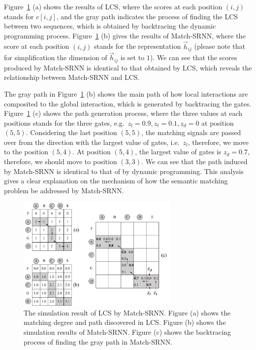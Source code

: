 Figure~\ref{fig:simulation} (a) shows the results of LCS, where the scores at each position $(i,j)$ stands for $c[i,j]$, and the gray path indicates the process of finding the LCS between two sequences, which is obtained by backtracing the dynamic programming process. Figure~\ref{fig:simulation} (b) gives the results of Match-SRNN, where the score at each position $(i,j)$ stands for the representation $\vec{h}_{ij}$ (please note that for simplification the dimension of $\vec{h}_{ij}$ is set to $1$). We can see that the scores produced by Match-SRNN is identical to that obtained by LCS, which reveals the relationship between Match-SRNN and LCS.

The gray path in Figure~\ref{fig:simulation} (b) shows the main path of how local interactions are composited to the global interaction, which
is generated by backtracing the gates. Figure~\ref{fig:simulation} (c) shows the path generation process, where the three values at each positions stands for the three gates, e.g.~$z_l{=}0.9,z_t{=}0.1,z_d{=}0$ at position $(5,5)$. Considering the last position $(5,5)$, the matching signals are passed over from the direction with the largest value of gates, i.e.~$z_l$, therefore, we move to the position $(5,4)$. At position $(5,4)$, the largest value of gates is $z_d{=}0.7$, therefore, we should move to position $(3,3)$. We can see that the path induced by Match-SRNN is identical to that of by dynamic programming. This analysis gives a clear explanation on the mechanism of how the semantic matching problem be addressed by Match-SRNN.

\begin{figure}[t]
\centering
\includegraphics[width=0.7\textwidth]{figures/lcs_simulation_more.pdf}
\caption{The simulation result of LCS by Match-SRNN. Figure (a) shows the matching degree and path discovered in LCS. Figure (b) shows the simulation results of Match-SRNN. Figure (c) shows the backtracing process of finding the gray path in Match-SRNN.}\label{fig:simulation}
\end{figure}

